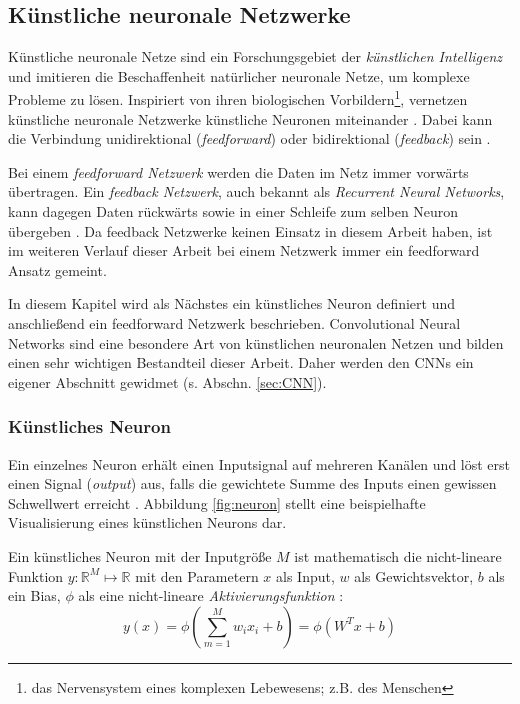 \subsection{Künstliche neuronale Netzwerke}
\label{sec:KNN}
Künstliche neuronale Netze sind ein Forschungsgebiet der \textit{künstlichen Intelligenz} und imitieren die Beschaffenheit natürlicher neuronale Netze, um komplexe Probleme zu lösen. Inspiriert von ihren biologischen Vorbildern\footnote{das Nervensystem eines komplexen Lebewesens; z.B. des Menschen}, vernetzen künstliche neuronale Netzwerke künstliche Neuronen miteinander \cite{johnsonCS231nConvolutionalNeural}. Dabei kann die Verbindung unidirektional (\textit{feedforward}) oder bidirektional (\textit{feedback}) sein \cite{goodfellowDeepLearning2016}. 

Bei einem \textit{feedforward Netzwerk} werden die Daten im Netz immer vorwärts übertragen. Ein \textit{feedback Netzwerk}, auch bekannt als \textit{Recurrent Neural Networks}, kann dagegen Daten rückwärts sowie in einer Schleife zum selben Neuron übergeben \cite{goodfellowDeepLearning2016}. Da feedback Netzwerke keinen Einsatz in diesem Arbeit haben, ist im weiteren Verlauf dieser Arbeit bei einem Netzwerk immer ein feedforward Ansatz gemeint. 

In diesem Kapitel wird als Nächstes ein künstliches Neuron definiert und anschließend ein feedforward Netzwerk beschrieben. Convolutional Neural Networks sind eine besondere Art von künstlichen neuronalen Netzen und bilden einen sehr wichtigen Bestandteil dieser Arbeit. Daher werden den CNNs ein eigener Abschnitt gewidmet (s. Abschn. \ref{sec:CNN}).


\subsubsection{Künstliches Neuron}
Ein einzelnes Neuron erhält einen Inputsignal auf mehreren Kanälen und löst erst einen Signal (\textit{output}) aus, falls die gewichtete Summe des Inputs einen gewissen Schwellwert erreicht \cite{johnsonCS231nConvolutionalNeural}. Abbildung \ref{fig:neuron} stellt eine beispielhafte Visualisierung eines künstlichen Neurons dar.

Ein künstliches Neuron mit der Inputgröße $M$ ist mathematisch die nicht-lineare Funktion $y : \mathbb{R}^M \mapsto \mathbb{R}$ mit den Parametern $x$ als Input, $w$ als Gewichtsvektor, $b$ als ein Bias, $\phi$ als eine nicht-lineare \textit{Aktivierungsfunktion} \cite{johnsonCS231nConvolutionalNeural}:
\begin{equation}
	\label{eq:neuron}
	y(x)=\phi\left(\sum_{m=1}^{M} w_{i} x_{i} + b\right) = \phi(W^Tx+b)
\end{equation}


